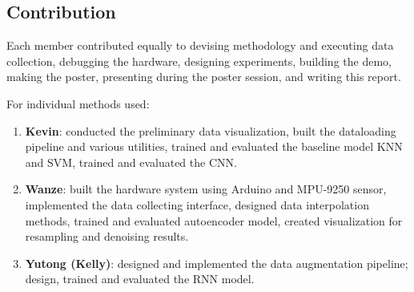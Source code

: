 \documentclass{article}
\begin{document}
\begin{multicols*}{2}
\newpage
\section{Contribution}

Each member contributed equally to devising methodology and executing data collection, debugging the hardware, designing experiments, building the demo, making the poster, presenting during the poster session, and writing this report.

For individual methods used:

\begin{enumerate}[label=-]
    \item \textbf{Kevin}: conducted the preliminary data visualization, built the dataloading pipeline and various utilities, trained and evaluated the baseline model KNN and SVM, trained and evaluated the CNN.
    \item \textbf{Wanze}: built the hardware system using Arduino and MPU-9250 sensor, implemented the data collecting interface, designed data interpolation methods, trained and evaluated autoencoder model, created visualization for resampling and denoising results.
    \item \textbf{Yutong (Kelly)}: designed and implemented the data augmentation pipeline; design, trained and evaluated the RNN model.
\end{enumerate}


  


\end{multicols*}
\end{document}
